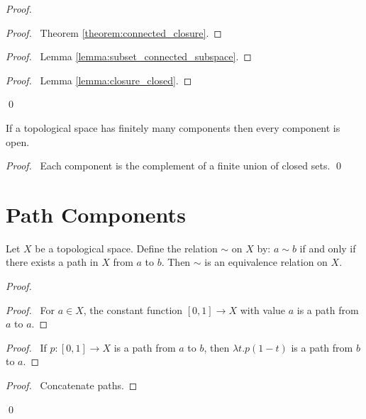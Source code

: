 \begin{proof}
    \pf
    \begin{proof}
        \pf\ Theorem \ref{theorem:connected_closure}.
    \end{proof}
    \begin{proof}
        \pf\ Lemma \ref{lemma:subset_connected_subspace}.
    \end{proof}
    \begin{proof}
        \pf\ Lemma \ref{lemma:closure_closed}.
    \end{proof}
    \qed
\end{proof}

\begin{proposition}
    If a topological space has finitely many components then every component is open.
\end{proposition}

\begin{proof}
    \pf\ Each component is the complement of a finite union of closed sets. \qed
\end{proof}

\section{Path Components}

\begin{proposition}
    Let $X$ be a topological space. Define the relation $\sim$ on $X$ by:
    $a \sim b$ if and only if there exists a path in $X$ from $a$ to $b$.
    Then $\sim$ is an equivalence relation on $X$.
\end{proposition}

\begin{proof}
    \pf
    \begin{proof}
        \pf\ For $a \in X$, the constant function $[0,1] \rightarrow X$
        with value $a$ is a path from $a$ to $a$.
    \end{proof}
    \begin{proof}
        \pf\ If $p : [0,1] \rightarrow X$ is a path from $a$ to $b$,
        then $\lambda t.p(1-t)$ is a path from $b$ to $a$.
    \end{proof}
    \begin{proof}
        \pf\ Concatenate paths.
    \end{proof}
    \qed
\end{proof}

